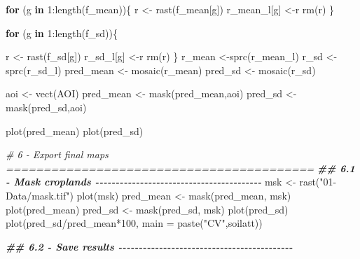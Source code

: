 \documentclass[
  10pt,
  b5paper,
  oneside]{book}
\newenvironment{Shaded}{\begin{snugshade}}{\end{snugshade}}
\newcommand{\AttributeTok}[1]{\textcolor[rgb]{0.77,0.63,0.00}{#1}}
\newcommand{\CommentTok}[1]{\textcolor[rgb]{0.56,0.35,0.01}{\textit{#1}}}
\newcommand{\ControlFlowTok}[1]{\textcolor[rgb]{0.13,0.29,0.53}{\textbf{#1}}}
\newcommand{\DecValTok}[1]{\textcolor[rgb]{0.00,0.00,0.81}{#1}}
\newcommand{\DocumentationTok}[1]{\textcolor[rgb]{0.56,0.35,0.01}{\textbf{\textit{#1}}}}
\newcommand{\FunctionTok}[1]{\textcolor[rgb]{0.00,0.00,0.00}{#1}}
\newcommand{\NormalTok}[1]{#1}
\newcommand{\OtherTok}[1]{\textcolor[rgb]{0.56,0.35,0.01}{#1}}
\newcommand{\SpecialCharTok}[1]{\textcolor[rgb]{0.00,0.00,0.00}{#1}}
\newcommand{\StringTok}[1]{\textcolor[rgb]{0.31,0.60,0.02}{#1}}
\begin{document}
\begin{Shaded}
\begin{Highlighting}[]
\ControlFlowTok{for}\NormalTok{ (g }\ControlFlowTok{in} \DecValTok{1}\SpecialCharTok{:}\FunctionTok{length}\NormalTok{(f\_mean))\{}
\NormalTok{  r }\OtherTok{\textless{}{-}} \FunctionTok{rast}\NormalTok{(f\_mean[g])}
\NormalTok{  r\_mean\_l[g] }\OtherTok{\textless{}{-}}\NormalTok{r}
  \FunctionTok{rm}\NormalTok{(r)}
\NormalTok{\}}

\ControlFlowTok{for}\NormalTok{ (g }\ControlFlowTok{in} \DecValTok{1}\SpecialCharTok{:}\FunctionTok{length}\NormalTok{(f\_sd))\{}
  
\NormalTok{  r }\OtherTok{\textless{}{-}} \FunctionTok{rast}\NormalTok{(f\_sd[g])}
\NormalTok{  r\_sd\_l[g] }\OtherTok{\textless{}{-}}\NormalTok{r}
  \FunctionTok{rm}\NormalTok{(r)}
\NormalTok{\}}
\NormalTok{r\_mean }\OtherTok{\textless{}{-}}\FunctionTok{sprc}\NormalTok{(r\_mean\_l)}
\NormalTok{r\_sd }\OtherTok{\textless{}{-}}\FunctionTok{sprc}\NormalTok{(r\_sd\_l)}
\NormalTok{pred\_mean }\OtherTok{\textless{}{-}} \FunctionTok{mosaic}\NormalTok{(r\_mean)}
\NormalTok{pred\_sd }\OtherTok{\textless{}{-}} \FunctionTok{mosaic}\NormalTok{(r\_sd)}

\NormalTok{aoi }\OtherTok{\textless{}{-}} \FunctionTok{vect}\NormalTok{(AOI)}
\NormalTok{pred\_mean }\OtherTok{\textless{}{-}} \FunctionTok{mask}\NormalTok{(pred\_mean,aoi)}
\NormalTok{pred\_sd }\OtherTok{\textless{}{-}} \FunctionTok{mask}\NormalTok{(pred\_sd,aoi)}


\FunctionTok{plot}\NormalTok{(pred\_mean)}
\FunctionTok{plot}\NormalTok{(pred\_sd)}


\CommentTok{\# 6 {-} Export final maps =========================================}
\DocumentationTok{\#\# 6.1 {-} Mask croplands {-}{-}{-}{-}{-}{-}{-}{-}{-}{-}{-}{-}{-}{-}{-}{-}{-}{-}{-}{-}{-}{-}{-}{-}{-}{-}{-}{-}{-}{-}{-}{-}{-}{-}{-}{-}{-}{-}{-}{-}{-}}
\NormalTok{msk }\OtherTok{\textless{}{-}} \FunctionTok{rast}\NormalTok{(}\StringTok{"01{-}Data/mask.tif"}\NormalTok{)}
\FunctionTok{plot}\NormalTok{(msk)}
\NormalTok{pred\_mean }\OtherTok{\textless{}{-}} \FunctionTok{mask}\NormalTok{(pred\_mean, msk)}
\FunctionTok{plot}\NormalTok{(pred\_mean)}
\NormalTok{pred\_sd }\OtherTok{\textless{}{-}} \FunctionTok{mask}\NormalTok{(pred\_sd, msk)}
\FunctionTok{plot}\NormalTok{(pred\_sd)}
\FunctionTok{plot}\NormalTok{(pred\_sd}\SpecialCharTok{/}\NormalTok{pred\_mean}\SpecialCharTok{*}\DecValTok{100}\NormalTok{, }\AttributeTok{main =} \FunctionTok{paste}\NormalTok{(}\StringTok{"CV"}\NormalTok{,soilatt))}

\DocumentationTok{\#\# 6.2 {-} Save results {-}{-}{-}{-}{-}{-}{-}{-}{-}{-}{-}{-}{-}{-}{-}{-}{-}{-}{-}{-}{-}{-}{-}{-}{-}{-}{-}{-}{-}{-}{-}{-}{-}{-}{-}{-}{-}{-}{-}{-}{-}{-}{-}}


\end{Highlighting}
\end{Shaded}
\end{document}
